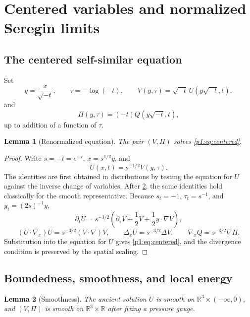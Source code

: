 \documentclass[11pt]{amsart}
\theoremstyle{plain}
\newtheorem{lemma}[lemma]{Lemma}
\theoremstyle{definition}
\theoremstyle{remark}
\numberwithin{equation}{section}
\newcommand{\R}{\mathbb R}
\begin{document}
\section{Centered variables and normalized Seregin limits}\label{p1:sec:seregin}

\subsection{The centered self-similar equation}

Set
\[
   y=\frac{x}{\sqrt{-t}},\qquad
   \tau=-\log(-t),\qquad
   V(y,\tau)=\sqrt{-t}\,U(y\sqrt{-t},t),
\]
and
\[
   \Pi(y,\tau)=(-t)Q(y\sqrt{-t},t),
\]
up to addition of a function of \(\tau\).

\begin{lemma}[Renormalized equation]\label{p1:lem:renormalized-equation}
The pair \((V,\Pi)\) solves \eqref{p1:eq:centered}.
\end{lemma}

\begin{proof}
Write \(s=-t=e^{-\tau}\), \(x=s^{1/2}y\), and
\[
   U(x,t)=s^{-1/2}V(y,\tau).
\]
The identities are first obtained in distributions by testing the equation
for \(U\) against the inverse change of variables.  After
\cref{p1:lem:smoothness}, the same identities hold classically for the smooth
representative.  Because \(s_t=-1\),
\(\tau_t=s^{-1}\), and \(y_t=(2s)^{-1}y\),
\[
   \partial_tU
   =
   s^{-3/2}\left(\partial_\tau V+\frac12V+\frac12y\cdot\nabla V\right),
\]
\[
   (U\cdot\nabla_x)U=s^{-3/2}(V\cdot\nabla)V,\qquad
   \Delta_xU=s^{-3/2}\Delta V,\qquad
   \nabla_xQ=s^{-3/2}\nabla\Pi.
\]
Substitution into the equation for \(U\) gives \eqref{p1:eq:centered}, and the
divergence condition is preserved by the spatial scaling.
\end{proof}

\subsection{Boundedness, smoothness, and local energy}

\begin{lemma}[Smoothness]\label{p1:lem:smoothness}
The ancient solution \(U\) is smooth on \(\R^3\times(-\infty,0)\), and
\((V,\Pi)\) is smooth on \(\R^3\times\R\) after fixing a pressure gauge.
\end{lemma}
\end{document}

